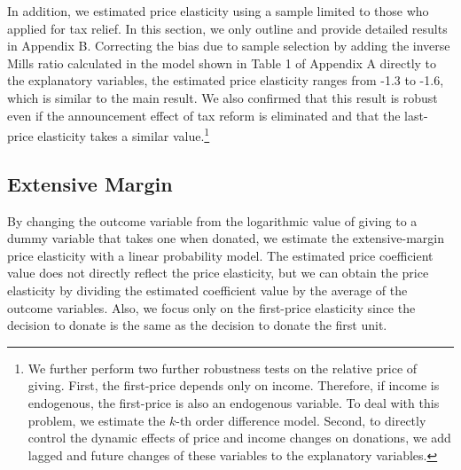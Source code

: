 \documentclass[
  11pt,
  a4paper,
]{article}
\begin{document}
In addition,
we estimated price elasticity
using a sample limited to those who applied for tax relief.
In this section, we only outline and provide detailed results in Appendix B.
Correcting the bias due to sample selection by
adding the inverse Mills ratio calculated in the model
shown in Table 1 of Appendix A directly to the explanatory variables,
the estimated price elasticity ranges from -1.3 to -1.6,
which is similar to the main result.
We also confirmed that
this result is robust
even if the announcement effect of tax reform is eliminated
and that the last-price elasticity takes a similar value.\footnote{We further perform two further robustness tests on the relative price of giving. First, the first-price depends only on income. Therefore, if income is endogenous, the first-price is also an endogenous variable. To deal with this problem, we estimate the \(k\)-th order difference model. Second, to directly control the dynamic effects of price and income changes on donations, we add lagged and future changes of these variables to the explanatory variables.}

\hypertarget{extensive-margin}{%
\subsection{Extensive Margin}\label{extensive-margin}}

By changing the outcome variable
from the logarithmic value of giving
to a dummy variable that takes one when donated,
we estimate the extensive-margin price elasticity
with a linear probability model.
The estimated price coefficient value
does not directly reflect the price elasticity,
but we can obtain the price elasticity
by dividing the estimated coefficient value
by the average of the outcome variables.
Also, we focus only on the first-price elasticity
since the decision to donate is the same as
the decision to donate the first unit.
\end{document}
